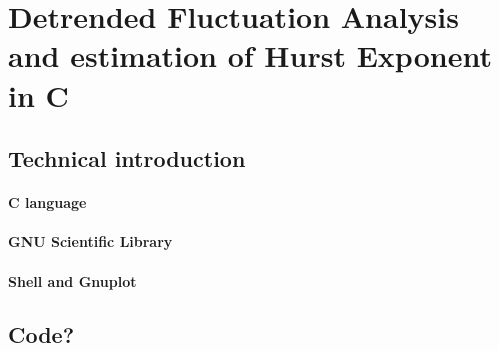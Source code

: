 \appendix
\section{Detrended Fluctuation Analysis and estimation of Hurst Exponent in C}
\subsection{Technical introduction}
\paragraph{C language}
\paragraph{GNU Scientific Library}
\paragraph{Shell and Gnuplot}

\subsection{Code?}\label{sec:code}

